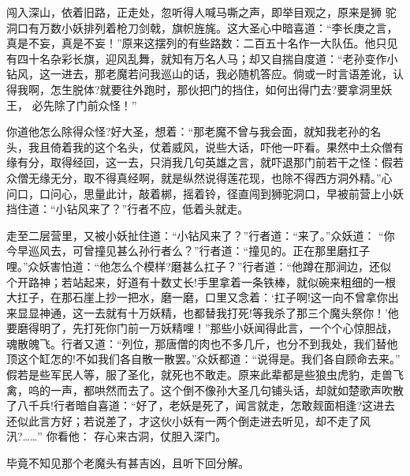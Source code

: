 闯入深山，依着旧路，正走处，忽听得人喊马嘶之声，即举目观之，原来是狮
驼洞口有万数小妖排列着枪刀剑戟，旗帜旌旄。这大圣心中暗喜道：“李长庚之言，
真是不妄，真是不妄！”原来这摆列的有些路数：二百五十名作一大队伍。他只见
有四十名杂彩长旗，迎风乱舞，就知有万名人马；却又自揣自度道：“老孙变作小
钻风，这一进去，那老魔若问我巡山的话，我必随机答应。倘或一时言语差讹，认
得我啊，怎生脱体?就要往外跑时，那伙把门的挡住，如何出得门去?要拿洞里妖王，
必先除了门前众怪！”

你道他怎么除得众怪?好大圣，想着：“那老魔不曾与我会面，就知我老孙的名
头，我且倚着我的这个名头，仗着威风，说些大话，吓他一吓看。果然中土众僧有
缘有分，取得经回，这一去，只消我几句英雄之言，就吓退那门前若干之怪：假若
众僧无缘无分，取不得真经啊，就是纵然说得莲花现，也除不得西方洞外精。”心
问口，口问心，思量此计，敲着梆，摇着铃，径直闯到狮驼洞口，早被前营上小妖
挡住道：“小钻风来了？”行者不应，低着头就走。

走至二层营里，又被小妖扯住道：“小钻风来了？”行者道：“来了。”众妖道：
“你今早巡风去，可曾撞见甚么孙行者么？”行者道：“撞见的。正在那里磨扛子
哩。”众妖害怕道：“他怎么个模样?磨甚么扛子？”行者道：“他蹲在那涧边，还似
个开路神；若站起来，好道有十数丈长!手里拿着一条铁棒，就似碗来粗细的一根
大扛子，在那石崖上抄一把水，磨一磨，口里又念着：‘扛子啊!这一向不曾拿你出
来显显神通，这一去就有十万妖精，也都替我打死!等我杀了那三个魔头祭你！’他
要磨得明了，先打死你门前一万妖精哩！”那些小妖闻得此言，一个个心惊胆战，
魂散魄飞。行者又道：“列位，那唐僧的肉也不多几斤，也分不到我处，我们替他
顶这个缸怎的!不如我们各自散一散罢。”众妖都道：“说得是。我们各自顾命去来。”
假若是些军民人等，服了圣化，就死也不敢走。原来此辈都是些狼虫虎豹，走兽飞
禽，呜的一声，都哄然而去了。这个倒不像孙大圣几句铺头话，却就如楚歌声吹散
了八千兵!行者暗自喜道：“好了，老妖是死了，闻言就走，怎敢觌面相逢?这进去
还似此言方好；若说差了，才这伙小妖有一两个倒走进去听见，却不走了风汛?……”
你看他：
存心来古洞，仗胆入深门。

毕竟不知见那个老魔头有甚吉凶，且听下回分解。